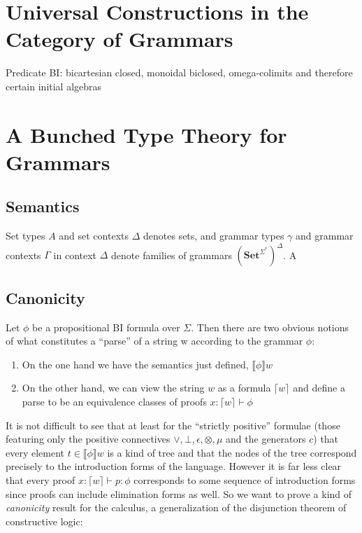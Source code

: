 \documentclass[sigconf,anonymous,review,screen]{acmart}
\newcommand{\Set}{\mathbf{Set}}
\begin{document}
\section{Universal Constructions in the Category of Grammars}

Predicate BI: bicartesian closed, monoidal biclosed, omega-colimits
and therefore certain initial algebras



\section{A Bunched Type Theory for Grammars}


\subsection{Semantics}

Set types $A$ and set contexts $\Delta$ denotes sets, and
grammar types $\gamma$ and grammar contexts $\Gamma$ in context
$\Delta$ denote families of grammars $(\Set^{\Sigma^*})^\Delta$.  A

\subsection{Canonicity}

Let $\phi$ be a propositional BI formula over $\Sigma$. Then there are
two obvious notions of what constitutes a ``parse'' of a string w
according to the grammar $\phi$:
\begin{enumerate}
\item On the one hand we have the semantics just defined, $\llbracket \phi \rrbracket w$
\item On the other hand, we can view the string $w$ as a formula
  $\lceil w \rceil$ and define a parse to be an equivalence classes of
  proofs $x:\lceil w \rceil \vdash \phi$
\end{enumerate}

It is not difficult to see that at least for the ``strictly positive''
formulae (those featuring only the positive connectives
$\vee,\bot,\epsilon,\otimes,\mu$ and the generators $c$) that every
element $t \in \llbracket \phi \rrbracket w$ is a kind of tree and
that the nodes of the tree correspond precisely to the introduction
forms of the language. However it is far less clear that every proof
$x:\lceil w \rceil \vdash p : \phi$ corresponds to some sequence of
introduction forms since proofs can include elimination forms as
well. So we want to prove a kind of \emph{canonicity} result for the
calculus, a generalization of the disjunction theorem of constructive
logic:
\end{document}

